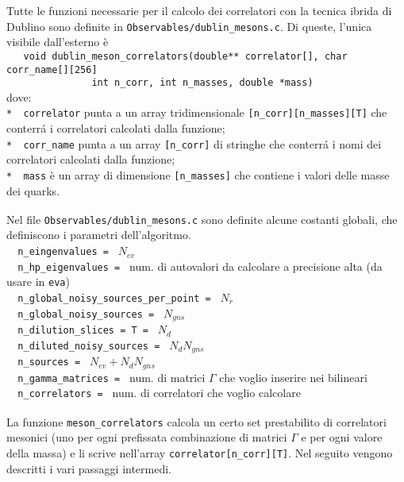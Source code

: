 \documentclass[a4paper]{article}
\begin{document}
Tutte le funzioni necessarie per il calcolo dei correlatori con la tecnica ibrida di Dublino sono definite in \verb|Observables/dublin_mesons.c|. Di queste, l'unica visibile dall'esterno \`{e} \\
\verb|   void dublin_meson_correlators(double** correlator[], char corr_name[][256]|\\
\verb|               int n_corr, int n_masses, double *mass)|\\
dove:\\
\verb|*  correlator| punta a un array tridimensionale \verb|[n_corr][n_masses][T]| che conterr\'{a} i correlatori calcolati dalla funzione;\\
\verb|*  corr_name| punta a un array \verb|[n_corr]| di stringhe che conterr\'{a} i nomi dei correlatori calcolati dalla funzione;\\
\verb|*  mass| \`{e} un array di dimensione \verb|[n_masses]| che contiene i valori delle masse dei quarks.\\
\verb| |\\

Nel file \verb|Observables/dublin_mesons.c| sono definite alcune costanti globali, che definiscono i parametri dell'algoritmo.\\
\verb|  n_eingenvalues = | $ N_{ev}$\\
\verb|  n_hp_eigenvalues = | num. di autovalori da calcolare a precisione alta (da usare in \verb|eva|)\\
\verb|  n_global_noisy_sources_per_point = | $ N_r $\\
\verb|  n_global_noisy_sources = | $ N_{gns} $\\
\verb|  n_dilution_slices = T = | $ N_d $\\
\verb|  n_diluted_noisy_sources = | $ N_d N_{gns} $\\
\verb|  n_sources = | $N_{ev} + N_d N_{gns}$ \\
\verb|  n_gamma_matrices = | num. di matrici $\Gamma$ che voglio inserire nei bilineari\\
\verb|  n_correlators = | num. di correlatori che voglio calcolare\\
\verb| |\\

La funzione \verb|meson_correlators| calcola un certo set prestabilito di correlatori mesonici (uno per ogni prefissata combinazione di matrici $\Gamma$ e per ogni valore della massa) e li scrive nell'array \verb|correlator[n_corr][T]|. Nel seguito vengono descritti i vari passaggi intermedi.
\end{document}
